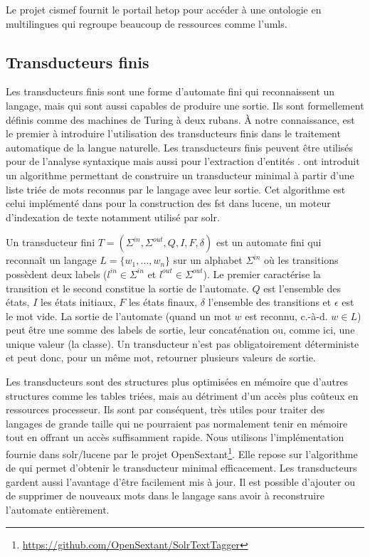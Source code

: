 Le projet \gls{cismef} fournit le portail \gls{hetop} pour accéder à une ontologie en multilingues qui regroupe beaucoup de ressources comme l'\gls{umls}.

\subsection{Transducteurs finis}

Les transducteurs finis sont une forme d'automate fini qui reconnaissent un langage, mais qui sont aussi capables de produire une sortie.
Ils sont formellement définis comme des machines de Turing à deux rubans.
À notre connaissance, \cite{grossUseFiniteAutomata1989} est le premier à introduire l'utilisation des transducteurs finis dans le traitement automatique de la langue naturelle.
Les transducteurs finis peuvent être utilisés pour de l'analyse syntaxique \cite{briscoeRobustAccurateStatistical2002} mais aussi pour l'extraction d'entités \cite{gaioExtendedNamedEntity2017}.
\cite{mihovDirectConstructionMinimal2001} ont introduit un algorithme permettant de construire un transducteur minimal à partir d'une liste triée de mots reconnus par le langage avec leur sortie.
Cet algorithme est celui implémenté dans pour la construction des \gls{fst} dans \gls{lucene}, un moteur d'indexation de texte notamment utilisé par \gls{solr}.

\begin{definition}[FST]
    Un transducteur fini $T = (\Sigma^{in}, \Sigma^{out}, Q, I, F, \delta)$ est un automate fini qui reconnaît un langage $L = \{w_1, \dots, w_n\}$ sur un alphabet $\Sigma^{in}$ où les transitions possèdent deux labels ($l^{in} \in \Sigma^{in}$ et $l^{out} \in \Sigma^{out}$).
    Le premier caractérise la transition et le second constitue la sortie de l'automate.
    $Q$ est l'ensemble des états, $I$ les états initiaux, $F$ les états finaux, $\delta$ l'ensemble des transitions et $\epsilon$ est le mot vide.
    La sortie de l'automate (quand un mot $w$ est reconnu, c.-à-d. $w \in L$) peut être une somme des labels de sortie, leur concaténation ou, comme ici, une unique valeur (la classe).
    Un transducteur n'est pas obligatoirement déterministe et peut donc, pour un même mot, retourner plusieurs valeurs de sortie.
\end{definition}

Les transducteurs sont des structures plus optimisées en mémoire que d'autres structures comme les tables triées, mais au détriment d'un accès plus coûteux en ressources processeur.
Ils sont par conséquent, très utiles pour traiter des langages de grande taille qui ne pourraient pas normalement tenir en mémoire tout en offrant un accès suffisamment rapide.
Nous utilisons l'implémentation fournie dans \gls{solr}/\gls{lucene} par le projet OpenSextant\footnote{\url{https://github.com/OpenSextant/SolrTextTagger}}.
Elle repose sur l'algorithme de \cite{mihovDirectConstructionMinimal2001} qui permet d'obtenir le transducteur minimal efficacement.
Les transducteurs gardent aussi l'avantage d'être facilement mis à jour.
Il est possible d'ajouter ou de supprimer de nouveaux mots dans le langage sans avoir à reconstruire l'automate entièrement.

